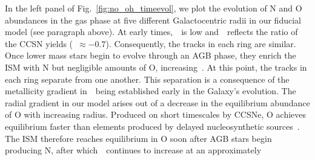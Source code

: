 \documentclass[ms.tex]{subfiles}
\begin{document}
\par
In the left panel of Fig.~\ref{fig:no_oh_timeevol}, we plot the evolution of N
and O abundances in the gas phase at five different Galactocentric radii
in our fiducial model (see paragraph above).
At early times,~\oh~is low and~\no~reflects the ratio of the CCSN yields
(\no\subcc~$\approx -0.7$).
Consequently, the tracks in each ring are similar.
Once lower mass stars begin to evolve through an AGB phase, they enrich the
ISM with N but negligible amounts of O, increasing~\no.
At this point, the tracks in each ring separate from one another.
This separation is a consequence of the metallicity gradient in~\oh~being
established early in the Galaxy's evolution.
The radial gradient in our model arises out of a decrease in the equilibrium
abundance of O with increasing radius.
Produced on short timescales by CCSNe, O achieves equilibrium faster than
elements produced by delayed nucleosynthetic sources~\citep{Weinberg2017}.
The ISM therefore reaches equilibrium in O soon after AGB stars begin
producing N, after which~\no~continues to increase at an approximately
\end{document}
